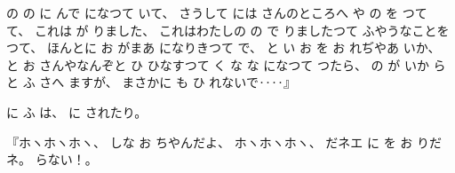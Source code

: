 %
の
の
に
んで
になつて
いて、
%
さうして
には
さんのところへ
や
の
を
つて
て、
%
これは
が
りました、
%
これはわたしの
の
で
りましたつて
ふやうなことを
つて、
%
ほんとに
お
がまあ
になりきつて
で、
%
と
い
お
を
お
れぢやあ
いか、
%
と
お
さんやなんぞと
ひ
ひなすつて
く
な
な
になつて
つたら、
%
の
が
いか
らと
ふ
さへ
ますが、
%
まさかに
も
ひ
れないで‥‥』

%
に
ふ
は、
%
に
されたり。

%
『ホヽホヽホヽ、
%
しな
お
ちやんだよ、
%
ホヽホヽホヽ、
%
だネエ
に
を
お
りだネ。
%
らない！。

